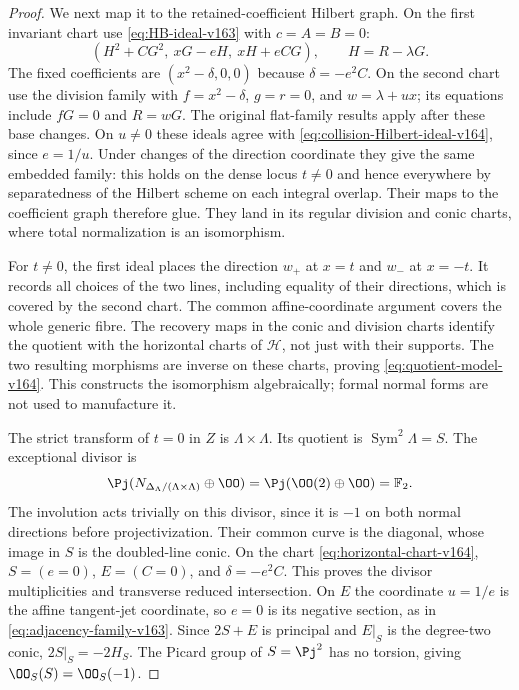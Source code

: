\begin{proof}
We next map it to the retained-coefficient Hilbert graph. On the
first invariant chart use \eqref{eq:HB-ideal-v163} with $c=A=B=0$:
\begin{equation}\label{eq:collision-Hilbert-ideal-v164}
 (H^2+CG^2,\ xG-eH,\ xH+eCG),\qquad H=R-\lambda G.
\end{equation}
The fixed coefficients are $(x^2-\delta,0,0)$ because
$\delta=-e^2C$. On the second chart use the division family with
$f=x^2-\delta$, $g=r=0$, and $w=\lambda+ux$; its equations include
$fG=0$ and $R=wG$. The original flat-family results apply after
these base changes. On $u\ne0$ these ideals agree with
\eqref{eq:collision-Hilbert-ideal-v164}, since $e=1/u$.
Under changes of the direction coordinate they give the same
embedded family: this holds on the dense locus $t\ne0$ and hence
everywhere by separatedness of the Hilbert scheme on each integral
overlap. Their maps to the coefficient graph therefore glue.
They land in its regular division and conic charts, where total
normalization is an isomorphism.

For $t\ne0$, the first ideal places the direction $w_+$ at $x=t$
and $w_-$ at $x=-t$. It records all choices of the two lines,
including equality of their directions, which is covered by the
second chart. The common affine-coordinate argument covers the
whole generic fibre. The recovery maps in the conic and division
charts identify the quotient with the horizontal charts of
$\mathcal H$, not just with their supports. The two resulting
morphisms are inverse on these charts, proving
\eqref{eq:quotient-model-v164}. This constructs the isomorphism
algebraically; formal normal forms are not used to manufacture it.

The strict transform of $t=0$ in $Z$ is
$\Lambda\times\Lambda$. Its quotient is
$\operatorname{Sym}^2\Lambda=S$. The exceptional divisor is
\[
 \Pj(N_{\Delta_\Lambda/(\Lambda\times\Lambda)}\oplus\OO)
       =\Pj(\OO(2)\oplus\OO)=\mathbb F_2.
\]
The involution acts trivially on this divisor, since it is $-1$
on both normal directions before projectivization. Their common
curve is the diagonal, whose image in $S$ is the doubled-line
conic. On the chart \eqref{eq:horizontal-chart-v164}, $S=(e=0)$,
$E=(C=0)$, and $\delta=-e^2C$. This proves the divisor multiplicities
and transverse reduced intersection. On $E$ the coordinate
$u=1/e$ is the affine tangent-jet coordinate, so $e=0$ is its
negative section, as in \eqref{eq:adjacency-family-v163}.
Since $2S+E$ is principal and $E|_S$ is the degree-two conic,
$2S|_S=-2H_S$. The Picard group of $S=\Pj^2$ has no torsion,
giving $\OO_S(S)=\OO_S(-1)$.


\end{proof}
